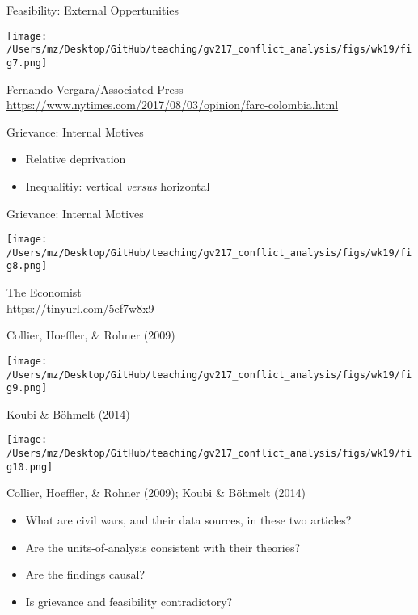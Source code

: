\documentclass{beamer}
\begin{document}
\begin{frame}{Feasibility: External Oppertunities}
    \begin{center}
        \texttt{[image: /Users/mz/Desktop/GitHub/teaching/gv217\_conflict\_analysis/figs/wk19/fig7.png]}
    \end{center}
    \tiny Fernando Vergara/Associated Press\\ \url{https://www.nytimes.com/2017/08/03/opinion/farc-colombia.html}
\end{frame}

\begin{frame}{Grievance: Internal Motives}
    \begin{itemize}
        \pause\item Relative deprivation
        \pause\item Inequalitiy: vertical \emph{versus} horizontal
    \end{itemize}
\end{frame}

\begin{frame}{Grievance: Internal Motives}
    \pause
    \begin{center}
        \texttt{[image: /Users/mz/Desktop/GitHub/teaching/gv217\_conflict\_analysis/figs/wk19/fig8.png]}
    \end{center}
    \tiny The Economist\\ \url{https://tinyurl.com/5ef7w8x9}
\end{frame}

\begin{frame}{Collier, Hoeffler, \& Rohner (2009)}
    \pause
    \begin{center}
        \texttt{[image: /Users/mz/Desktop/GitHub/teaching/gv217\_conflict\_analysis/figs/wk19/fig9.png]}
    \end{center}
\end{frame}

\begin{frame}{Koubi \& Böhmelt (2014)}
    \pause
    \begin{center}
        \texttt{[image: /Users/mz/Desktop/GitHub/teaching/gv217\_conflict\_analysis/figs/wk19/fig10.png]}
    \end{center}
\end{frame}

\begin{frame}{Collier, Hoeffler, \& Rohner (2009); Koubi \& Böhmelt (2014)}
    \begin{itemize}
        \pause\item What are civil wars, and their data sources, in these two articles?
        \pause\item Are the units-of-analysis consistent with their theories?
        \pause\item Are the findings causal?
        \pause\item Is grievance and feasibility contradictory?
    \end{itemize}
\end{frame}
\end{document}
